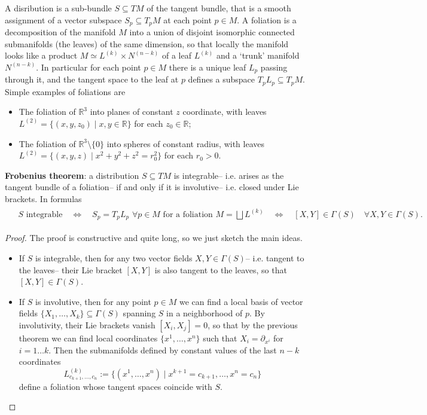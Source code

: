 \begin{mytheorem}
%
A disribution is a sub-bundle $S \subseteq TM$ of the tangent bundle, that is a smooth assignment of a vector subspace $S_p \subseteq T_p M$ at each point $p\in M$.
A foliation is a decomposition of the manifold $M$ into a union of disjoint isomorphic connected submanifolds (the leaves) of the same dimension, so that locally the manifold looks like a product $M \simeq L^{(k)} \times N^{(n-k)}$ of a leaf $L^{(k)}$ and a `trunk' manifold $N^{(n-k)}$.
In particular for each point $p\in M$ there is a unique leaf $L_p$ passing through it, and the tangent space to the leaf at $p$ defines a subspace $T_p L_p \subseteq T_p M$.
Simple examples of foliations are
\begin{itemize}
    \item The foliation of $\mathbb{R}^3$ into planes of constant $z$ coordinate, with leaves $L^{(2)} = \{(x,y,z_0) \mid x,y\in \mathbb{R}\}$ for each $z_0\in \mathbb{R}$;
    \item The foliation of $\mathbb{R}^3\setminus \{0\}$ into spheres of constant radius, with leaves $L^{(2)} = \{(x,y,z) \mid x^2+y^2+z^2 = r_0^2\}$ for each $r_0>0$.
\end{itemize}

\textbf{Frobenius theorem}: a distribution $S \subseteq TM$ is integrable-- i.e. arises as the tangent bundle of a foliation-- if and only if it is involutive-- i.e. closed under Lie brackets.
In formulas
\begin{align}
\begin{aligned}
    &S \text{ integrable} \quad \Leftrightarrow \quad S_p = T_pL_p \,\, \forall p\in M\text{ for a foliation } M = \bigsqcup L^{(k)} 
    \quad \Leftrightarrow \quad [X,Y] \in \Gamma(S) \quad \forall X,Y \in \Gamma(S).  
\end{aligned}
\end{align}
%
\end{mytheorem}
\begin{proof}
The proof is constructive and quite long, so we just sketch the main ideas.
\begin{itemize}
    \item[$\Rightarrow$] If $S$ is integrable, then for any two vector fields $X,Y \in \Gamma(S)$-- i.e. tangent to the leaves-- their Lie bracket $[X,Y]$ is also tangent to the leaves, so that $[X,Y] \in \Gamma(S)$.
    \item[$\Leftarrow$] If $S$ is involutive, then for any point $p\in M$ we can find a local basis of vector fields $\{X_1, \dots, X_k\} \subseteq \Gamma(S)$ spanning $S$ in a neighborhood of $p$.
    By involutivity, their Lie brackets vanish $[X_i,X_j]=0$, so that by the previous theorem we can find local coordinates $\{x^1, \dots, x^n\}$ such that $X_i = \partial_{x^i}$ for $i=1\dots k$.
    Then the submanifolds defined by constant values of the last $n-k$ coordinates
    \begin{equation}
        L^{(k)}_{c_{k+1}, \dots, c_n} := \{ (x^1, \dots, x^n) \mid x^{k+1} = c_{k+1}, \dots, x^n = c_n\}
    \end{equation}
    define a foliation whose tangent spaces coincide with $S$.
\end{itemize}
\end{proof}
